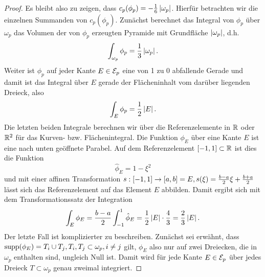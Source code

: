 \begin{proof}
Es bleibt also zu zeigen, dass $c_p(\phi_p) = -\frac 1 6 \, \lvert \omega_p\rvert$. Hierfür betrachten wir die einzelnen Summanden von $c_p(\phi_p)$. Zunächst berechnet das Integral von $\phi_p$ über $\omega_p$ das Volumen der von $\phi_p$ erzeugten Pyramide mit Grundfläche $\lvert \omega_p\rvert$, d.h.
\begin{align}\label{eq:4.35}
	\int_{\omega_p} \phi_p = \frac 13 \, \lvert \omega_p\rvert \, .
\end{align}
Weiter ist $\phi_p$ auf jeder Kante $E \in \mathcal E_p$ eine von 1 zu 0 abfallende Gerade und damit ist das Integral über $E$ gerade der Flächeninhalt vom darüber liegenden Dreieck, also
\begin{align}\label{eq:4.36}
	\int_E \phi_p = \frac 1 2 \, \lvert E\rvert \, .
\end{align}
Die letzten beiden Integrale berechnen wir über die Referenzelemente in $\mathbb{R}$ oder $\mathbb{R}^2$ für das Kurven- bzw. Flächenintegral. Die Funktion $\phi_E$ über eine Kante $E$ ist eine nach unten geöffnete Parabel. Auf dem Referenzelement $[-1,1]\subset\mathbb{R}$ ist dies die Funktion
\[
	\hat \phi_E = 1-\xi^2 
\]
und mit einer affinen Transformation $s: [-1,1]\rightarrow [a,b] = E, s(\xi) = \frac{b-a}2 \xi + \frac{b+a}2$ lässt sich das Referenzelement auf das Element $E$ abbilden. Damit ergibt sich mit dem Transformationssatz der Integration
\begin{align}\label{eq:4.37}
	\int_E \phi_E = \frac{b-a}2 \int_{-1}^1 \hat\phi_E = \frac 12 \, \lvert E\rvert \cdot \frac 43 = \frac 23 \, \lvert E\rvert\, .
\end{align}
Der letzte Fall ist komplizierter zu beschreiben. Zunächst sei erwähnt, dass $\operatorname{supp} (\phi_E) = T_i \cup T_j, T_i,T_j \subset \omega_p, i\not=j$ gilt, $\phi_E$ also nur auf zwei Dreiecken, die in $\omega_p$ enthalten sind, ungleich Null ist. Damit wird für jede Kante $E \in \mathcal E_p$ über jedes Dreieck $T \subset \omega_p$ genau zweimal integriert.


\end{proof}
